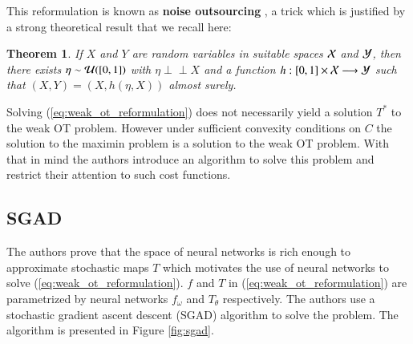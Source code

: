 \documentclass[11pt]{article}
\newtheorem{theorem}{Theorem}
\newcommand{\indep}{\perp \!\!\! \perp}
\begin{document}
This reformulation is known as \textbf{noise outsourcing} \cite{kallenberg2002foundations}, a trick which is justified by a strong theoretical result that we recall here:

\begin{theorem}
    If $X$ and $Y$ are random variables in suitable spaces ${\cal X}$ and ${\cal Y}$, then there exists $\eta\sim {\cal U}([0,1])$ with $\eta \indep X$ and a function $h: [0, 1]\times {\cal X} \longrightarrow {\cal Y}$ such that $(X, Y) = (X, h(\eta, X))$ almost surely.
\end{theorem}

Solving (\ref{eq:weak_ot_reformulation}) does not necessarily yield a solution $T^*$ to the weak OT problem. However under sufficient convexity conditions on $C$ the solution to the maximin problem is a solution to the weak OT problem. With that in mind the authors introduce an algorithm to solve this problem and restrict their attention to such cost functions.

\subsection{SGAD}

The authors prove that the space of neural networks is rich enough to approximate stochastic maps $T$ which motivates the use of neural networks to solve (\ref{eq:weak_ot_reformulation}). $f$ and $T$ in (\ref{eq:weak_ot_reformulation}) are parametrized by neural networks $f_{\omega}$ and $T_{\theta}$ respectively. The authors use a stochastic gradient ascent descent (SGAD) algorithm to solve the problem. The algorithm is presented in Figure \ref{fig:sgad}.
\end{document}
